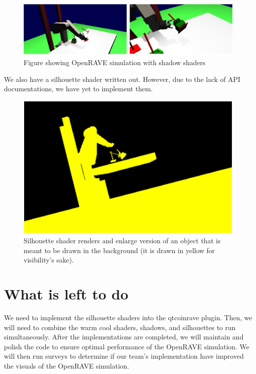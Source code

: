 \documentclass[10pt,journal,compsoc,draftclsnofoot]{IEEEtran}
\begin{document}
\begin{flushleft}
\begin{figure} [H]
  \includegraphics[scale=0.8]{Shadows.eps}
  \caption
{ \newline \hspace{\linewidth}
Figure showing OpenRAVE simulation with shadow shaders}
  \label{fig:Shadow}
\end{figure}

We also have a silhouette shader written out. However, due to the lack of API documentations, we have yet to implement them.

\begin{figure} [H]
  \includegraphics[scale=0.8]{Silhouette.eps}
  \caption
{ \newline \hspace{\linewidth}
Silhouette shader renders and enlarge version of an object that is meant to be drawn in the background (it is drawn in yellow for visibility's sake).}
  \label{fig:Silhouette}
\end{figure}

\section{What is left to do}
We need to implement the silhouette shaders into the qtcoinrave plugin.
Then, we will need to combine the warm cool shaders, shadows, and silhouettes to run simultaneously.
After the implementations are completed, we will maintain and polish the code to ensure optimal performance of the OpenRAVE simulation.
We will then run surveys to determine if our team's implementation have improved the visuals of the OpenRAVE simulation.


\end{flushleft}
\end{document}
